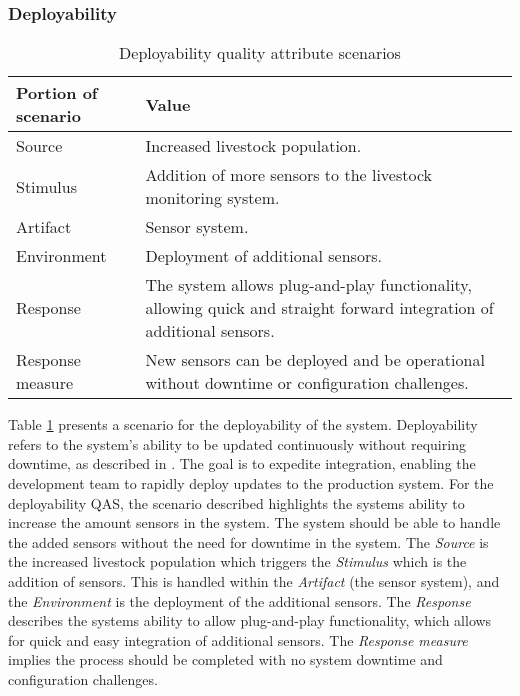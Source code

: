 \subsubsection{Deployability}

\begin{table}[h]
    \renewcommand{\arraystretch}{1.3}
    \caption{Deployability quality attribute scenarios}
    \label{deployability}
    \centering
    \begin{tabularx}{\columnwidth}{>{\hsize=0.3\hsize}X>{\hsize=0.7\hsize}X}
        \hline
        \textbf{Portion of scenario} & \textbf{Value}                                                                                                        \\
        \hline
        Source                       & Increased livestock population.                                                                                       \\
        Stimulus                     & Addition of more sensors to the livestock monitoring system.                                                          \\
        Artifact                     & Sensor system.                                                                                                        \\
        Environment                  & Deployment of additional sensors.                                                                                     \\
        Response                     & The system allows plug-and-play functionality, allowing quick and straight forward integration of additional sensors. \\
        Response measure             & New sensors can be deployed and be operational without downtime or configuration challenges.                          \\
        \hline
    \end{tabularx}
\end{table}


Table \ref{deployability} presents a scenario for the deployability of the system. Deployability refers to the system's ability to be updated continuously without requiring downtime, as described in \cite{bass2021software}. The goal is to expedite integration, enabling the development team to rapidly deploy updates to the production system.
For the deployability QAS, the scenario described highlights the systems ability to increase the amount sensors in the system. The system should be able to handle the added sensors without the need for downtime in the system.
The \textit{Source} is the increased livestock population which triggers the \textit{Stimulus} which is the addition of sensors. This is handled within the \textit{Artifact} (the sensor system), and the \textit{Environment} is the deployment of the additional sensors.
The \textit{Response} describes the systems ability to allow plug-and-play functionality, which allows for quick and easy integration of additional sensors. The \textit{Response measure} implies the process should be completed with no system downtime and configuration challenges. \newline